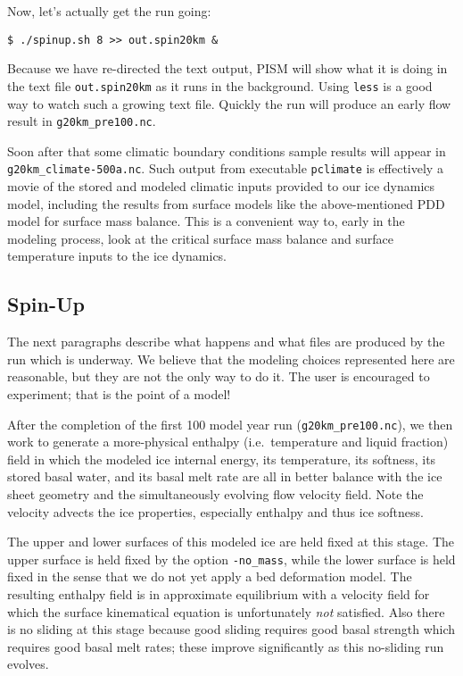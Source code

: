 Now, let's actually get the run going:
\begin{verbatim}
$ ./spinup.sh 8 >> out.spin20km &
\end{verbatim}
\noindent Because we have re-directed the text output, PISM will show what it is doing in the text file \texttt{out.spin20km} as it runs in the background.  Using \texttt{less} is a good way to watch such a growing text file.  Quickly the run will produce an early flow result in \texttt{g20km_pre100.nc}.

Soon after that some climatic boundary conditions sample results will appear in \texttt{g20km_climate-500a.nc}.  Such output from executable \texttt{pclimate} is effectively a movie of the stored and modeled climatic inputs provided to our ice dynamics model, including the results from surface models like the above-mentioned PDD model for surface mass balance.  This is a convenient way to, early in the modeling process, look at the critical surface mass balance and surface temperature inputs to the ice dynamics.


\subsection{Spin-Up}  \label{subsect:spinupsketch}  The next paragraphs describe what happens and what files are produced by the run which is underway.  We believe that the modeling choices represented here are reasonable, but they are not the only way to do it.  The user is encouraged to experiment; that is the point of a model!

After the completion of the first 100 model year run (\texttt{g20km_pre100.nc}), we then work to generate a more-physical enthalpy (i.e.~temperature and liquid fraction) field in which the modeled ice internal energy, its temperature, its softness, its stored basal water, and its basal melt rate are all in better balance with the ice sheet geometry and the simultaneously evolving flow velocity field.  Note the velocity advects the ice properties, especially enthalpy and thus ice softness.

The upper and lower surfaces of this modeled ice are held fixed at this stage.  The upper surface is held fixed by the option \texttt{-no_mass}, while the lower surface is held fixed in the sense that we do not yet apply a bed deformation model.  The resulting enthalpy field is in approximate equilibrium with a velocity field for which the surface kinematical equation \cite{Fowler} is unfortunately \emph{not} satisfied.  Also there is no sliding at this stage because good sliding requires good basal strength which requires good basal melt rates; these improve significantly as this no-sliding run evolves.

